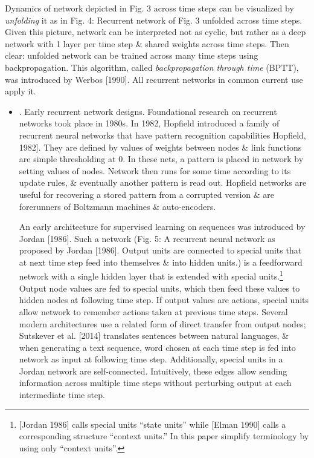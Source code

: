 \documentclass{article}
\begin{document}
\begin{enumerate}
\begin{itemize}
		Dynamics of network depicted in {\sf Fig. 3} across time steps can be visualized by {\it unfolding} it as in {\sf Fig. 4: Recurrent network of Fig. 3 unfolded across time steps.} Given this picture, network can be interpreted not as cyclic, but rather as a deep network with 1 layer per time step \& shared weights across time steps. Then clear: unfolded network can be trained across many time steps using backpropagation. This algorithm, called {\it backpropagation through time} (BPTT), was introduced by Werbos [1990]. All recurrent networks in common current use apply it.
		\begin{itemize}
			\item {. Early recurrent network designs.} Foundational research on recurrent networks took place in 1980s. In 1982, {\sc Hopfield} introduced a family of recurrent neural networks that have pattern recognition capabilities Hopfield, 1982]. They are defined by values of weights between nodes \& link functions are simple thresholding at 0. In these nets, a pattern is placed in network by setting values of nodes. Network then runs for some time according to its update rules, \& eventually another pattern is read out. Hopfield networks are useful for recovering a stored pattern from a corrupted version \& are forerunners of Boltzmann machines \& auto-encoders.
			
			An early architecture for supervised learning on sequences was introduced by Jordan [1986]. Such a network ({\sf Fig. 5: A recurrent neural network as proposed by Jordan [1986]. Output units are connected to special units that at next time step feed into themselves \& into hidden units.}) is a feedforward network with a single hidden layer that is extended with special units.\footnote{[Jordan 1986] calls special units ``state units'' while [Elman 1990] calls a corresponding structure ``context units.'' In this paper simplify terminology by using only ``context units''.} Output node values are fed to special units, which then feed these values to hidden nodes at following time step. If output values are actions, special units allow network to remember actions taken at previous time steps. Several modern architectures use a related form of direct transfer from output nodes; Sutskever et al. [2014] translates sentences between natural languages, \& when generating a text sequence, word chosen at each time step is fed into network as input at following time step. Additionally, special units in a Jordan network are self-connected. Intuitively, these edges allow sending information across multiple time steps without perturbing output at each intermediate time step.
			

\end{itemize}
\end{itemize}
\end{enumerate}
\end{document}
